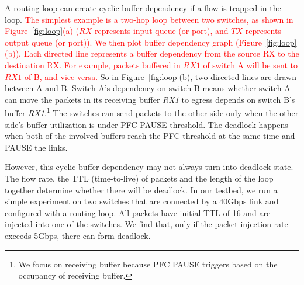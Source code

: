
A routing loop can create cyclic buffer dependency if a flow is trapped in the loop.
\textcolor{red}{The simplest example is a two-hop loop between two switches, as shown in Figure~\ref{fig:loop}(a) ($RX$ represents input
queue (or port), and $TX$ represents output queue (or port)). We then plot buffer dependency graph (Figure~\ref{fig:loop}(b)). Each directed line represents a buffer dependency from the source RX to the destination RX. For example, packets buffered in $RX1$ of switch A will be sent to $RX1$
of B, and vice versa.} So in Figure~\ref{fig:loop}(b), two directed lines are drawn between A and B.
Switch A's dependency on switch B means whether switch A can move
the packets in its receiving buffer {\em RX1} to egress depends on switch B's buffer {\em RX1}.\footnote{We
focus on receiving buffer because PFC PAUSE triggers based on the occupancy of receiving buffer.}
The switches can send packets to the other side only
when the other side's buffer utilization is under PFC PAUSE threshold. The deadlock happens when
both of the involved buffers reach the PFC threshold at the same time and PAUSE the links.


However, this cyclic buffer dependency may not always turn into deadlock state. The flow
 rate, the TTL (time-to-live) of packets and the length of the loop together
determine whether there will be deadlock. In our testbed, we run a simple experiment on
two switches that are connected by a 40Gbps link and configured with a routing loop.
All packets have initial TTL of 16 and are injected into one of the switches. We find that,
only if the packet injection rate exceeds 5Gbps, there can form deadlock.


